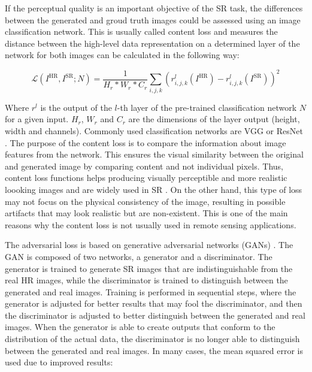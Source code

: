         If the perceptual quality is an important objective of the SR task, the differences between the generated and groud truth images could be assessed using an image classification network. This is usually called content loss and measures the distance between the high-level data representation on a determined layer of the network for both images can be calculated in the following way:

        \begin{equation}
            \mathcal{L}(I^{\text{HR}}, I^{\text{SR}}; N) = \frac{1}{H_r*W_r*C_r}\sum_{i,j,k}(r^{l}_{i,j,k}(I^{\text{HR}}) - r^{l}_{i,j,k}(I^{\text{SR}}))^2
        \end{equation}

        Where $r^{l}$ is the output of the $l$-th layer of the pre-trained classification network $N$ for a given input. $H_r$, $W_r$ and $C_r$ are the dimensions of the layer output (height, width and channels). 
        Commonly used classification networks are VGG \cite{simonyan2015deep} or ResNet \cite{he2015deep}.
        The purpose of the content loss is to compare the information about image features from the network. This ensures the visual similarity between the original and generated image by comparing content and not individual pixels. Thus, content loss functions helps producing visually perceptible and more realistic loooking images and are widely used in SR \cite{ledig2017photorealistic,wang2018recovering}. On the other hand, this type of loss may not focus on the physical consistency of the image, resulting in possible artifacts that may look realistic but are non-existent. This is one of the main reasons why the content loss is not usually used in remote sensing applications.

        The adversarial loss is based on generative adversarial networks (GANs) \cite{goodfellow2014generative}. The GAN is composed of two networks, a generator and a discriminator. The generator is trained to generate SR images that are indistinguishable from the real HR images, while the discriminator is trained to distinguish between the generated and real images. 
        Training is performed in sequential steps, where the generator is adjusted for better results that may fool the discriminator, and then the discriminator is adjusted to better distinguish between the generated and real images.
        When the generator is able to create outputs that conform to the distribution of the actual data, the discriminator is no longer able to distinguish between the generated and real images. In many cases, the mean squared error is used due to improved results: 

